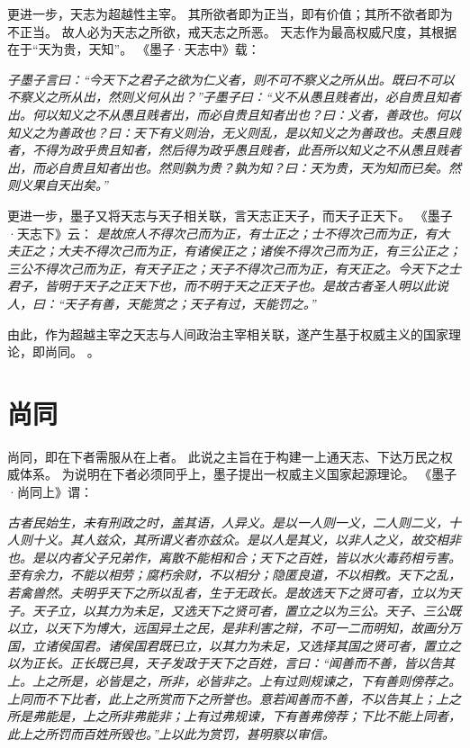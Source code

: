 \documentclass[11pt]{article}
\begin{document}
\newline

更进一步，天志为超越性主宰。
其所欲者即为正当，即有价值；其所不欲者即为不正当。
故人必为天志之所欲，戒天志之所恶。
天志作为最高权威尺度，其根据在于“天为贵，天知”。
《墨子·天志中》载：

\textit{子墨子言曰：“今天下之君子之欲为仁义者，则不可不察义之所从出。既曰不可以不察义之所从出，然则义何从出？”子墨子曰：“义不从愚且贱者出，必自贵且知者出。何以知义之不从愚且贱者出，而必自贵且知者出也？曰：义者，善政也。何以知义之为善政也？曰：天下有义则治，无义则乱，是以知义之为善政也。夫愚且贱者，不得为政乎贵且知者，然后得为政乎愚且贱者，此吾所以知义之不从愚且贱者出，而必自贵且知者出也。然则孰为贵？孰为知？曰：天为贵，天为知而已矣。然则义果自天出矣。”}

\newline

更进一步，墨子又将天志与天子相关联，言天志正天子，而天子正天下。
《墨子·天志下》云：
\textit{是故庶人不得次己而为正，有士正之；士不得次己而为正，有大夫正之；大夫不得次己而为正，有诸侯正之；诸俟不得次己而为正，有三公正之；三公不得次己而为正，有天子正之；天子不得次己而为正，有天正之。今天下之士君子，皆明于天子之正天下也，而不明于天之正天子也。是故古者圣人明以此说人，曰：“天子有善，天能赏之；天子有过，天能罚之。”}

由此，作为超越主宰之天志与人间政治主宰相关联，遂产生基于权威主义的国家理论，即尚同。
。
\section{尚同}
尚同，即在下者需服从在上者。
此说之主旨在于构建一上通天志、下达万民之权威体系。
为说明在下者必须同乎上，墨子提出一权威主义国家起源理论。
《墨子·尚同上》谓：

\textit{古者民始生，未有刑政之时，盖其语，人异义。是以一人则一义，二人则二义，十人则十义。其人兹众，其所谓义者亦兹众。是以人是其义，以非人之义，故交相非也。是以内者父子兄弟作，离散不能相和合；天下之百姓，皆以水火毒药相亏害。至有余力，不能以相劳；腐朽余财，不以相分；隐匿良道，不以相教。天下之乱，若禽兽然。夫明乎天下之所以乱者，生于无政长。是故选天下之贤可者，立以为天子。天子立，以其力为未足，又选天下之贤可者，置立之以为三公。天子、三公既以立，以天下为博大，远国异土之民，是非利害之辩，不可一二而明知，故画分万国，立诸侯国君。诸侯国君既已立，以其力为未足，又选择其国之贤可者，置立之以为正长。正长既已具，天子发政于天下之百姓，言曰：“闻善而不善，皆以告其上。上之所是，必皆是之，所非，必皆非之。上有过则规谏之，下有善则傍荐之。上同而不下比者，此上之所赏而下之所誉也。意若闻善而不善，不以告其上；上之所是弗能是，上之所非弗能非；上有过弗规谏，下有善弗傍荐；下比不能上同者，此上之所罚而百姓所毁也。”上以此为赏罚，甚明察以审信。}
\end{document}
